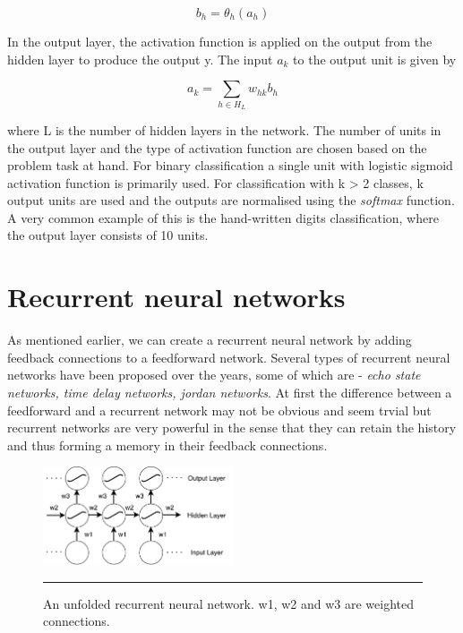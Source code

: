     \begin{equation}
        b_{h} = \theta_{h}(a_{h})
    \end{equation}

In the output layer, the activation function is applied on the output from the hidden layer to
produce the output y. The input $a_{k}$ to the output unit is given by

    \begin{equation}
        a_{k} = \displaystyle\sum_{h \in H_{L}} w_{hk}b_{h}
    \end{equation}

where L is the number of hidden layers in the network. The number of units in the output layer
and the type of activation function are chosen based on the problem task at hand. For binary
classification a single unit with logistic sigmoid activation function is primarily used. For
classification with k > 2 classes, k output units are used and the outputs are normalised using
the \emph{softmax} function. A very common example of this is the hand-written digits classification,
where the output layer consists of 10 units.

\section{Recurrent neural networks}
As mentioned earlier, we can create a recurrent neural network by adding feedback connections to
a feedforward network. Several types of recurrent neural networks have been proposed over the
years, some of which are - \emph{echo state networks, time delay networks, jordan networks}. At
first the difference between a feedforward and a recurrent network may not be obvious and seem
trvial but recurrent networks are very powerful in the sense that they can retain the history and
thus forming a memory in their feedback connections.

\begin{figure}[htbp]
  \centering
    \includegraphics[width=0.5\textwidth,height=0.5\textheight,keepaspectratio]
    {Figures/unfolded-rnn.pdf}
    \rule{35em}{0.5pt}
  \caption[An unfolded RNN] {An unfolded recurrent neural network. w1, w2 and w3 are weighted
  connections. }
  \label{fig:unfoldedRNN}
\end{figure}

